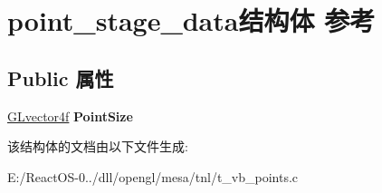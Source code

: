 \hypertarget{structpoint__stage__data}{}\section{point\+\_\+stage\+\_\+data结构体 参考}
\label{structpoint__stage__data}
\subsection*{Public 属性}
\begin{DoxyCompactItemize}
\item 
\mbox{\label{structpoint__stage__data_ae0fe56fc1ffffdcb319f79a5ce7792ea}} 
\hyperlink{struct_g_lvector4f}{G\+Lvector4f} {\bfseries Point\+Size}
\end{DoxyCompactItemize}


该结构体的文档由以下文件生成\+:\begin{DoxyCompactItemize}
\item 
E\+:/\+React\+O\+S-\/0../dll/opengl/mesa/tnl/t\+\_\+vb\+\_\+points.\+c\end{DoxyCompactItemize}
